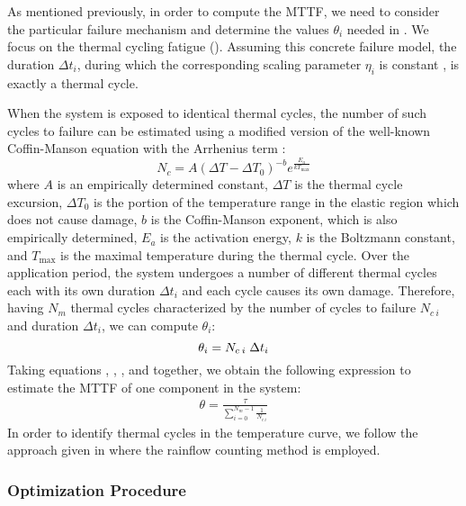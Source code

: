 As mentioned previously, in order to compute the MTTF, we need to consider the
particular failure mechanism and determine the values $\theta_i$ needed in
. We focus on the thermal cycling fatigue
(). Assuming this concrete failure model, the duration
$\Delta t_i$, during which the corresponding scaling parameter $\eta_i$ is
constant , is exactly a thermal cycle.

When the system is exposed to identical thermal cycles, the number of such
cycles to failure can be estimated using a modified version of the well-known
Coffin-Manson equation with the Arrhenius term \cite{xiang2010, jedec2010}:
\[
  N_c = A (\Delta T - \Delta T_0)^{-b} e^{\frac{E_a}{k T_\text{max}}}
\]
where $A$ is an empirically determined constant, $\Delta T$ is the thermal cycle
excursion, $\Delta T_0$ is the portion of the temperature range in the elastic
region which does not cause damage, $b$ is the Coffin-Manson exponent, which is
also empirically determined, $E_{a}$ is the activation energy, $k$ is the
Boltzmann constant, and $T_\text{max}$ is the maximal temperature during the
thermal cycle. Over the application period, the system undergoes a number of
different thermal cycles each with its own duration $\Delta t_i$ and each cycle
causes its own damage. Therefore, having $N_m$ thermal cycles characterized by
the number of cycles to failure $N_{c\:i}$ and duration $\Delta t_i$, we can
compute $\theta_i$:
\begin{equation} \elab{mttf-cycle}
  \theta_i = N_{c \: i} \; \Delta t_i
\end{equation}
Taking equations , , , and
 together, we obtain the following expression to estimate the
MTTF of one component in the system:
\begin{align}
  \theta = \frac{\tau}{\sum_{i=0}^{N_m - 1} \frac{1}{N_{c \: i}}}
\end{align}
In order to identify thermal cycles in the temperature curve, we follow the
approach given in \cite{xiang2010} where the rainflow counting method is
employed.

\subsubsection{Optimization Procedure}

